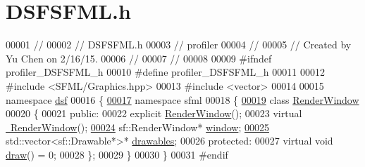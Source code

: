 \hypertarget{_d_s_f_s_f_m_l_8h_source}{}\section{D\+S\+F\+S\+F\+M\+L.\+h}
\label{_d_s_f_s_f_m_l_8h_source}

\begin{DoxyCode}
00001 \textcolor{comment}{//}
00002 \textcolor{comment}{//  DSFSFML.h}
00003 \textcolor{comment}{//  profiler}
00004 \textcolor{comment}{//}
00005 \textcolor{comment}{//  Created by Yu Chen on 2/16/15.}
00006 \textcolor{comment}{//}
00007 \textcolor{comment}{//}
00008 
00009 \textcolor{preprocessor}{#ifndef profiler\_DSFSFML\_h}
00010 \textcolor{preprocessor}{#define profiler\_DSFSFML\_h}
00011 
00012 \textcolor{preprocessor}{#include <SFML/Graphics.hpp>}
00013 \textcolor{preprocessor}{#include <vector>}
00014 
00015 \textcolor{keyword}{namespace }\hyperlink{namespacedsf}{dsf}
00016 \{
\hypertarget{_d_s_f_s_f_m_l_8h_source_l00017}{}\hyperlink{namespacedsf_1_1sfml}{00017}     \textcolor{keyword}{namespace }sfml
00018     \{
\hypertarget{_d_s_f_s_f_m_l_8h_source_l00019}{}\hyperlink{classdsf_1_1sfml_1_1_render_window}{00019}         \textcolor{keyword}{class }\hyperlink{classdsf_1_1sfml_1_1_render_window}{RenderWindow}
00020         \{
00021         \textcolor{keyword}{public}:
00022             \textcolor{keyword}{explicit} \hyperlink{classdsf_1_1sfml_1_1_render_window_a86b08e1ee47f8cde51a731050be2f360}{RenderWindow}();
00023             \textcolor{keyword}{virtual} \hyperlink{classdsf_1_1sfml_1_1_render_window_a3ef144a6351af67efcb71a647417da64}{~RenderWindow}();
\hypertarget{_d_s_f_s_f_m_l_8h_source_l00024}{}\hyperlink{classdsf_1_1sfml_1_1_render_window_a2c04b61ca1bfba140120001c4a9a30e1}{00024}             sf::RenderWindow* \hyperlink{classdsf_1_1sfml_1_1_render_window_a2c04b61ca1bfba140120001c4a9a30e1}{window};
\hypertarget{_d_s_f_s_f_m_l_8h_source_l00025}{}\hyperlink{classdsf_1_1sfml_1_1_render_window_a745350dfdb1f752359f9055d714c453d}{00025}             std::vector<sf::Drawable*>* \hyperlink{classdsf_1_1sfml_1_1_render_window_a745350dfdb1f752359f9055d714c453d}{drawables};
00026         \textcolor{keyword}{protected}:
00027             \textcolor{keyword}{virtual} \textcolor{keywordtype}{void} \hyperlink{classdsf_1_1sfml_1_1_render_window_ae61615a7eaa041c97ac4aed62361479a}{draw}() = 0;
00028         \};
00029     \}
00030 \}
00031 \textcolor{preprocessor}{#endif}
\end{DoxyCode}
